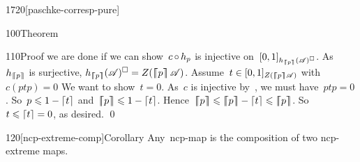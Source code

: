 \begin{parsec}{1720}[paschke-corresp-pure]
\begin{point}{100}{Theorem}
\begin{point}{110}{Proof}
    we are done if we can show~$c \mathop{\circ} h_p$
    is injective on~$[0,1]_{h_{\left\lceil\!\!\left\lceil p\right\rceil\!\!\right\rceil}(\mathscr{A})^\square}$.
As~$h_{\left\lceil\!\!\left\lceil p\right\rceil\!\!\right\rceil}$ is surjective,
    $h_{\cceil{p}}(\scrA)^\square = Z(\cceil{p} \scrA)$.
    Assume~$t \in [0,1]_{Z(\left\lceil\!\!\left\lceil p\right\rceil\!\!\right\rceil \mathscr{A})}$ with~$c(ptp)=0$
We want to show~$t = 0$.
As~$c$ is injective by~,
        we must have~$ptp = 0$.
So~$p \leqslant 1- \left\lceil t\right\rceil$
and~$\left\lceil\!\!\left\lceil p\right\rceil\!\!\right\rceil \leqslant 1- \left\lceil t\right\rceil$.
Hence~$\cceil{p} \leq \cceil{p} - \ceil{t} \leq \cceil{p}$.
So~$t \leqslant \left\lceil t \right\rceil=0$, as desired. \qed
\end{point}
\end{point}
\begin{point}{120}[ncp-extreme-comp]{Corollary}%
    Any~ncp-map is the composition of two ncp-extreme maps.
\end{point}
\end{parsec}


